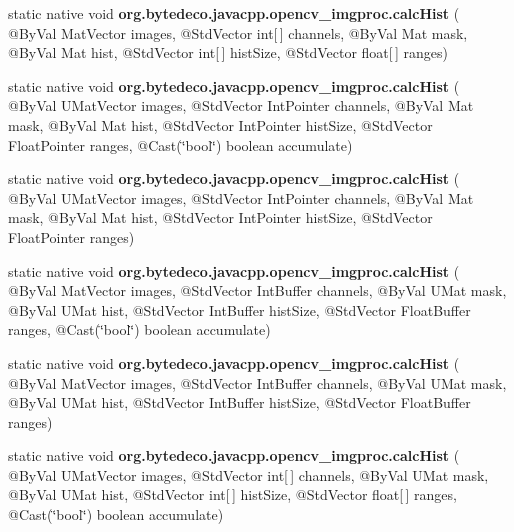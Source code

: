 \begin{DoxyCompactItemize}
static native void {\bfseries org.\+bytedeco.\+javacpp.\+opencv\+\_\+imgproc.\+calc\+Hist} ( @By\+Val Mat\+Vector images, @Std\+Vector int\mbox{[}$\,$\mbox{]} channels, @By\+Val Mat mask, @By\+Val Mat hist, @Std\+Vector int\mbox{[}$\,$\mbox{]} hist\+Size, @Std\+Vector float\mbox{[}$\,$\mbox{]} ranges)
\item 
\mbox{\label{group__imgproc__hist_gad28f0f3e832ea1914cead23468929e9c}} 
static native void {\bfseries org.\+bytedeco.\+javacpp.\+opencv\+\_\+imgproc.\+calc\+Hist} ( @By\+Val U\+Mat\+Vector images, @Std\+Vector Int\+Pointer channels, @By\+Val Mat mask, @By\+Val Mat hist, @Std\+Vector Int\+Pointer hist\+Size, @Std\+Vector Float\+Pointer ranges, @Cast(\char`\"{}bool\char`\"{}) boolean accumulate)
\item 
\mbox{\label{group__imgproc__hist_ga715b1487141969b5984ef236e39bf4a1}} 
static native void {\bfseries org.\+bytedeco.\+javacpp.\+opencv\+\_\+imgproc.\+calc\+Hist} ( @By\+Val U\+Mat\+Vector images, @Std\+Vector Int\+Pointer channels, @By\+Val Mat mask, @By\+Val Mat hist, @Std\+Vector Int\+Pointer hist\+Size, @Std\+Vector Float\+Pointer ranges)
\item 
\mbox{\label{group__imgproc__hist_ga4653ced3c298d8131ffaab69f027fe6a}} 
static native void {\bfseries org.\+bytedeco.\+javacpp.\+opencv\+\_\+imgproc.\+calc\+Hist} ( @By\+Val Mat\+Vector images, @Std\+Vector Int\+Buffer channels, @By\+Val U\+Mat mask, @By\+Val U\+Mat hist, @Std\+Vector Int\+Buffer hist\+Size, @Std\+Vector Float\+Buffer ranges, @Cast(\char`\"{}bool\char`\"{}) boolean accumulate)
\item 
\mbox{\label{group__imgproc__hist_gad155fc5f3f2238168b1d13978e79f69a}} 
static native void {\bfseries org.\+bytedeco.\+javacpp.\+opencv\+\_\+imgproc.\+calc\+Hist} ( @By\+Val Mat\+Vector images, @Std\+Vector Int\+Buffer channels, @By\+Val U\+Mat mask, @By\+Val U\+Mat hist, @Std\+Vector Int\+Buffer hist\+Size, @Std\+Vector Float\+Buffer ranges)
\item 
\mbox{\label{group__imgproc__hist_ga5f25e576c6034ea47935a2609ad90ccc}} 
static native void {\bfseries org.\+bytedeco.\+javacpp.\+opencv\+\_\+imgproc.\+calc\+Hist} ( @By\+Val U\+Mat\+Vector images, @Std\+Vector int\mbox{[}$\,$\mbox{]} channels, @By\+Val U\+Mat mask, @By\+Val U\+Mat hist, @Std\+Vector int\mbox{[}$\,$\mbox{]} hist\+Size, @Std\+Vector float\mbox{[}$\,$\mbox{]} ranges, @Cast(\char`\"{}bool\char`\"{}) boolean accumulate)

\end{DoxyCompactItemize}
